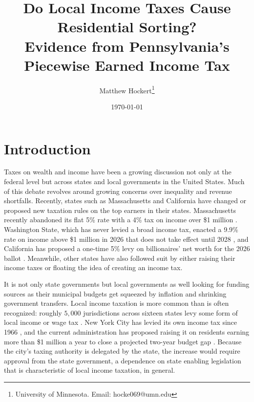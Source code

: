 \documentclass[12pt]{article}
\title{Do Local Income Taxes Cause Residential
Sorting? \\
\large Evidence from Pennsylvania’s Piecewise Earned Income Tax}
\author{Matthew Hockert\thanks{University of Minnesota. Email: hocke069@umn.edu}}
\date{\today}
\begin{document}
\maketitle

\begin{abstract}
\begin{onehalfspace}

\end{onehalfspace}
\end{abstract}

\newpage

\section{Introduction}
\label{sec:intro}

Taxes on wealth and income have been a growing discussion not only at the federal level but across states and local governments in the United States. Much of this debate revolves around growing concerns over inequality and revenue shortfalls. Recently, states such as Massachusetts and California have changed or proposed new taxation rules on the top earners in their states. Massachusetts recently abandoned its flat 5\% rate with a 4\% tax on income over \$1 million \citep{vermeerMassachusettsSurtax2022}. Washington State, which has never levied a broad income tax, enacted a 9.9\% rate on income above \$1 million in 2026 that does not take effect until 2028 \citep{waSB6346_2026}, and California has proposed a one-time 5\% levy on billionaires' net worth for the 2026 ballot \citep{walczakCaliforniaWealthTax2026}. Meanwhile, other states have also followed suit by either raising their income taxes or floating the idea of creating an income tax. 

It is not only state governments but local governments as well looking for funding sources as their municipal budgets get squeezed by inflation and shrinking government transfers. Local income taxation is more common than is often recognized: roughly $5{,}000$ jurisdictions across sixteen states levy some form of local income or wage tax \citep{walczakLocalIncomeTaxes2023}. New York City has levied its own income tax since 1966 \citep{walczakLocalIncomeTaxes2023}, and the current administration has proposed raising it on residents earning more than \$1 million a year to close a projected two-year budget gap \citep{nycMayorsOfficePrelimBudget2026}. Because the city's taxing authority is delegated by the state, the increase would require approval from the state government, a dependence on state enabling legislation that is characteristic of local income taxation, in general.
\end{document}
